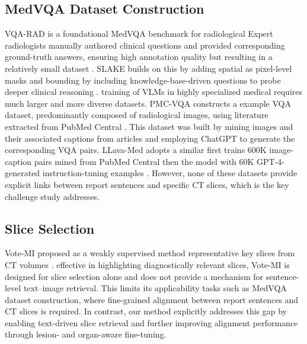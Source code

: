 \documentclass[bioengineering,article,submit,pdftex,moreauthors]{Definitions/mdpi}
\begin{document}
\subsection{MedVQA Dataset Construction}
VQA-RAD is a foundational MedVQA benchmark for radiological  
Expert radiologists manually authored clinical questions and provided corresponding ground-truth answers, ensuring high annotation quality but resulting in a relatively small dataset \cite{lau_dataset_2018}. 
SLAKE builds on this by adding spatial  as pixel-level masks and bounding  by including knowledge-base-driven questions to probe deeper clinical reasoning \cite{liu_slake_2021}.
 training of VLMs in highly specialized medical  requires much larger and more diverse datasets. 
PMC-VQA constructs a  example VQA dataset, predominantly composed of radiological images, using literature extracted from PubMed Central \cite{zhang_pmc-vqa_2024}.
This dataset was built by mining images and their associated captions from articles and employing ChatGPT to generate the corresponding VQA pairs.
LLava-Med adopts a similar   first trains 600K image-caption pairs mined from PubMed Central  then  the model with 60K GPT-4-generated instruction-tuning examples \cite{li_llava-med_2023}.
However, none of these datasets provide explicit links between report sentences and specific CT slices, which is the key challenge  study addresses.

\subsection{Slice Selection}

  Vote-MI  proposed as a weakly supervised method   representative key slices from CT volumes \cite{wang_enhancing_2024}.  effective in highlighting diagnostically relevant slices, Vote-MI is designed for slice selection alone and does not provide a mechanism for sentence-level text–image retrieval. This limits its applicability  tasks such as MedVQA dataset construction, where fine-grained alignment between report sentences and CT slices is required. In contrast, our method explicitly addresses this gap by enabling text-driven slice retrieval and further improving alignment performance through lesion- and organ-aware fine-tuning.
\end{document}
